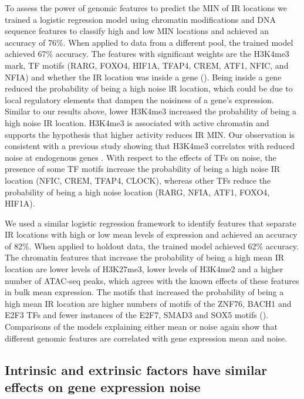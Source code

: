 To assess the power of genomic features to predict the MIN of IR locations we trained a logistic regression model using chromatin modifications and DNA sequence features to classify high and low MIN locations and achieved an accuracy of 76\%. When applied to data from a different pool, the trained model achieved 67\% accuracy. The features with significant weights are the H3K4me3 mark, TF motifs (RARG, FOXO4, HIF1A, TFAP4, CREM, ATF1, NFIC, and NFIA) and whether the IR location was inside a gene (). Being inside a gene reduced the probability of being a high noise lR location, which could be due to local regulatory elements that dampen the noisiness of a gene’s expression. Similar to our results above, lower H3K4me3 increased the probability of being a high noise IR location. H3K4me3 is associated with active chromatin and supports the hypothesis that higher activity reduces IR MIN. Our observation is consistent with a previous study showing that H3K4me3 correlates with reduced noise at endogenous genes \cite{faureaj_lehnerb:SystematicAnalysis2017}. With respect to the effects of TFs on noise, the presence of some TF motifs increase the probability of being a high noise IR location (NFIC, CREM, TFAP4, CLOCK), whereas other TFs reduce the probability of being a high noise location (RARG, NFIA, ATF1, FOXO4, HIF1A). 

We used a similar logistic regression framework to identify features that separate IR locations with high or low mean levels of expression and achieved an accuracy of 82\%. When applied to holdout data, the trained model achieved 62\% accuracy. The chromatin features that increase the probability of being a high mean IR location are lower levels of H3K27me3, lower levels of H3K4me2 and a higher number of ATAC-seq peaks, which agrees with the known effects of these features in bulk mean expression. The motifs that increased the probability of being a high mean IR location are higher numbers of motifs of the ZNF76, BACH1 and E2F3 TFs and fewer instances of the E2F7, SMAD3 and SOX5 motifs (). Comparisons of the models explaining either mean or noise again show that different genomic features are correlated with gene expression mean and noise.

\subsection{Intrinsic and extrinsic factors have similar effects on gene expression noise}

